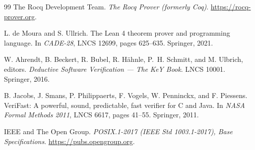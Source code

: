 \documentclass[11pt]{article}
\begin{document}
\begin{thebibliography}{99}
 The Rocq Development Team. \emph{The Rocq Prover (formerly
Coq)}. \url{https://rocq-prover.org}.

 L. de Moura and S. Ullrich. The Lean 4 theorem prover and
programming language. In \emph{CADE-28}, LNCS 12699, pages 625--635.
Springer, 2021.

 W. Ahrendt, B. Beckert, R. Bubel, R. H\"ahnle, P.~H. Schmitt,
and M. Ulbrich, editors. \emph{Deductive Software Verification --- The KeY
Book}. LNCS 10001. Springer, 2016.

 B. Jacobs, J. Smans, P. Philippaerts, F. Vogels,
W. Penninckx, and F. Piessens. VeriFast: A powerful, sound, predictable,
fast verifier for C and Java. In \emph{NASA Formal Methods 2011},
LNCS 6617, pages 41--55. Springer, 2011.

 IEEE and The Open Group. \emph{POSIX.1-2017 (IEEE Std
1003.1-2017), Base Specifications}. \url{https://pubs.opengroup.org}.

\end{thebibliography}
\end{document}
